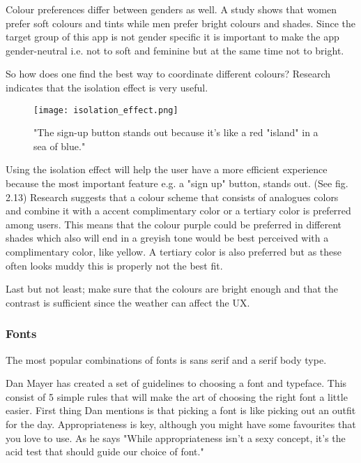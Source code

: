 Colour preferences differ between genders as well. A study shows that women prefer soft colours and tints while men prefer bright colours and shades. \cite{ColorMeaning} Since the target group of this app is not gender specific it is important to make the app gender-neutral i.e. not to soft and feminine but at the same time not to bright. 

So how does one find the best way to coordinate different colours? Research indicates that the isolation effect is very useful.

\begin{figure}[H]
\centering
\texttt{[image: isolation\_effect.png]}
\caption{"The sign-up button stands out because it's like a red "island" in a sea of blue." \cite{ColorMeaning}}
\end{figure}

Using the isolation effect will help the user have a more efficient experience because the most important feature e.g. a "sign up" button, stands out. \cite{ColorMeaning} (See fig. 2.13)%
Research suggests that a colour scheme that consists of analogues colors and combine it with a accent complimentary color or a tertiary color is preferred among users. \cite{ColorMeaning} 
This means that the colour purple could be preferred in different shades which also will end in a greyish tone would be best perceived with a complimentary color, like yellow. A tertiary color is also preferred but as these often looks muddy this is properly not the best fit.

Last but not least; make sure that the colours are bright enough and that the contrast is sufficient since the weather can affect the UX. \cite{Graphic}

\subsubsection{Fonts}
The most popular combinations of fonts is sans serif and a serif body type. \cite{TypeComb}

Dan Mayer has created a set of guidelines to choosing a font and typeface. This consist of 5 simple rules that will make the art of choosing the right font a little easier. First thing Dan mentions is that picking a font is like picking out an outfit for the day. Appropriateness is key, although you might have some favourites that you love to use. As he says "While appropriateness isn't a sexy concept, it's the acid test that should guide our choice of font." \cite{Font}

